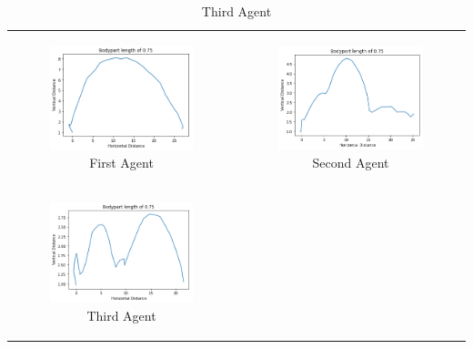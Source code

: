 \documentclass[12pt,oneside,listof=totoc,paper=a4,headings=small]{scrbook}
\begin{document}
{\centering
\begin{table}[h!]
\begin{tabular}{cc}
\begin{subfigure}{0.4\textwidth}\centering\includegraphics[width=0.75\columnwidth]{images/length_075_1.png}\caption{First Agent}\label{fig:fourplotlengtha}\end{subfigure}&
\begin{subfigure}{0.4\textwidth}\centering\includegraphics[width=0.75\columnwidth]{images/length_075_2.png}\caption{Second Agent}\label{fig:fourplotlengthb}\end{subfigure}\\
\newline
\begin{subfigure}{0.4\textwidth}\centering\includegraphics[width=0.75\columnwidth]{images/length_075_3.png}\caption{Third Agent}\label{fig:fourplotlengthc}\end{subfigure}&

\end{tabular}
\end{table}}
\end{document}
